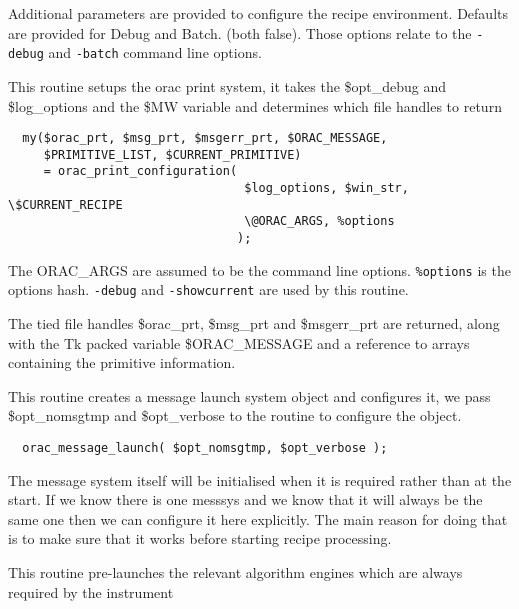 \begin{description}
Additional parameters are provided to configure the recipe
environment. Defaults are provided for Debug and Batch.
(both false). Those options relate to the \texttt{-debug} and \texttt{-batch}
command line options.


\item[\textbf{orac\_print\_configuration}] \mbox{}

This routine setups the orac print system, it takes the \$opt\_debug and
\$log\_options and the \$MW variable and determines which file handles to return

\begin{verbatim}
  my($orac_prt, $msg_prt, $msgerr_prt, $ORAC_MESSAGE,
     $PRIMITIVE_LIST, $CURRENT_PRIMITIVE)    
     = orac_print_configuration( 
                                 $log_options, $win_str, \$CURRENT_RECIPE 
                                 \@ORAC_ARGS, %options
                                );
\end{verbatim}


The ORAC\_ARGS are assumed to be the command line options. \texttt{\%options}
is the options hash. \texttt{-debug} and \texttt{-showcurrent} are used by this
routine.



The tied file handles \$orac\_prt, \$msg\_prt and \$msgerr\_prt are
returned, along with the Tk packed variable \$ORAC\_MESSAGE and
a reference to arrays containing the primitive information.


\item[\textbf{orac\_message\_launch}] \mbox{}

This routine creates a message launch system object and configures it,
we pass \$opt\_nomsgtmp and \$opt\_verbose to the routine to configure the
object.

\begin{verbatim}
  orac_message_launch( $opt_nomsgtmp, $opt_verbose );
\end{verbatim}


The message system itself will be initialised when it is required 
rather than at the start. If we know there is one messsys and we 
know that it will always be the same one then we can configure it here explicitly. The main reason for doing that is to make sure that it 
works before starting recipe processing.


\item[\textbf{orac\_start\_algorithm\_engines}] \mbox{}

This routine pre-launches the relevant algorithm engines which are always required by the instrument


\end{description}

